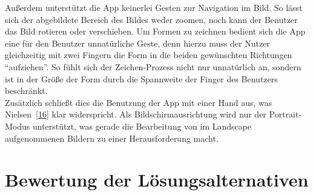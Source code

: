  Außerdem unterstützt die App keinerlei Gesten zur Navigation im Bild. So lässt sich der abgebildete Bereich des Bildes weder zoomen, noch kann der Benutzer das Bild rotieren oder verschieben. Um Formen zu zeichnen bedient sich die App eine für den Benutzer unnatürliche Geste, denn hierzu muss der Nutzer gleichzeitig mit zwei Fingern die Form in die beiden gewünschten Richtungen ``aufziehen''. So fühlt sich der Zeichen-Prozess nicht nur unnatürlich an, sondern ist in der Größe der Form durch die Spannweite der Finger des Benutzers beschränkt. \\
 
 Zusätzlich schließt dies die Benutzung der App mit einer Hand aus, was Nielsen~\ref{16} klar widerspricht. Als Bildschirmausrichtung wird nur der Portrait-Modus unterstützt, was gerade die Bearbeitung von im Landscape aufgenommenen Bildern zu einer Herausforderung macht. \\

\section{Bewertung der Lösungsalternativen}

